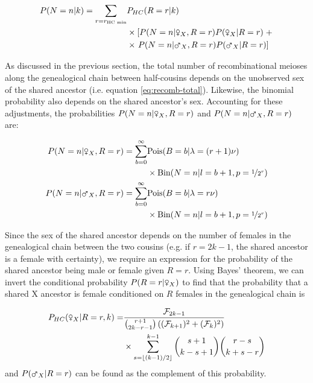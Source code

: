 \documentclass[9pt,twocolumn,twoside]{gsajnl}
\newcommand{\msxa}{\mars_X}
\newcommand{\fsxa}{\venus_X}
\begin{document}
\begin{align}
  \label{eq:prob-n-half-cousins}
  P(N=n | k)  = \sum_{r=r_\text{HC min}} &P_{HC}(R=r | k)  \nonumber \\
  &\times \left[  P(N = n | \fsxa, R=r) P(\fsxa | R=r) \; + \right. \nonumber \\
  &\times \left. P(N = n | \msxa, R=r) P(\msxa | R=r) \right]
\end{align}

As discussed in the previous section, the total number of recombinational
meioses along the genealogical chain between half-cousins depends on the
unobserved sex of the shared ancestor (i.e. equation \eqref{eq:recomb-total}).
Likewise, the binomial probability also depends on the shared ancestor's sex.
Accounting for these adjustments, the probabilities $P(N = n | \fsxa, R=r)$ and
$P(N = n | \msxa, R=r)$ are:

\begin{subequations}
\begin{align}
  P(N = n | \fsxa, R=r) = \sum_{b=0}^\infty  &\text{Pois}(B = b | \lambda = (r+1)\nu)  \nonumber \\
  &\times \text{Bin}(N=n | l = b + 1, p=\nicefrac{1}{2^r}) \label{eq:prob-n-each-female} \\
  P(N = n | \msxa, R=r) = \sum_{b=0}^\infty  &\text{Pois}(B = b | \lambda = r\nu)  \nonumber \\
  &\times \text{Bin}(N=n | l = b + 1, p=\nicefrac{1}{2^r}) \label{eq:prob-n-each-male} 
\end{align}
\end{subequations}

Since the sex of the shared ancestor depends on the number of females in the
genealogical chain between the two cousins (e.g. if $r=2k-1$, the shared
ancestor is a female with certainty), we require an expression for the
probability of the shared ancestor being male or female given $R=r$. Using
Bayes' theorem, we can invert the conditional probability $P(R = r | \fsxa)$ to
find that the probability that a shared X ancestor is female conditioned on $R$
females in the genealogical chain is

\begin{align}
  \label{eq:prob-female-given-r}
  P_{HC}(\fsxa | R=r, k) =& \frac{\mathcal{F}_{2k-1} }{ { r+1 \choose 2k-r-1 }  \left( (\mathcal{F}_{k+1})^2 + (\mathcal{F}_k)^2 \right) }  \nonumber\\
  & \times \sum_{s=\lfloor (k-1)/2 \rfloor}^{k-1}  {s + 1 \choose k - s + 1 } { r - s \choose k + s - r }
\end{align}
%
and $P(\msxa | R=r)$ can be found as the complement of this probability.
\end{document}
